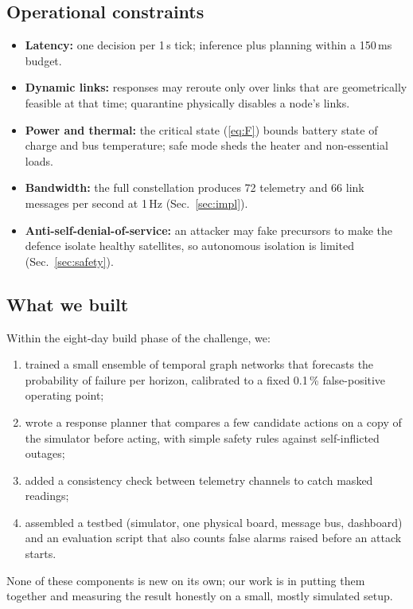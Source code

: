\documentclass[conference]{IEEEtran}
\begin{document}
\subsection{Operational constraints}
\begin{itemize}
\item \textbf{Latency:} one decision per 1\,s tick; inference plus planning within a 150\,ms budget.
\item \textbf{Dynamic links:} responses may reroute only over links that are geometrically feasible
at that time; quarantine physically disables a node's links.
\item \textbf{Power and thermal:} the critical state (\ref{eq:F}) bounds battery state of charge and
bus temperature; safe mode sheds the heater and non-essential loads.
\item \textbf{Bandwidth:} the full constellation produces 72 telemetry and 66 link messages per second
at 1\,Hz (Sec.~\ref{sec:impl}).
\item \textbf{Anti-self-denial-of-service:} an attacker may fake precursors to make the defence
isolate healthy satellites, so autonomous isolation is limited (Sec.~\ref{sec:safety}).
\end{itemize}

\subsection{What we built}
Within the eight-day build phase of the challenge, we:
\begin{enumerate}
\item trained a small ensemble of temporal graph networks that forecasts the probability of failure
per horizon, calibrated to a fixed 0.1\,\% false-positive operating point;
\item wrote a response planner that compares a few candidate actions on a copy of the simulator
before acting, with simple safety rules against self-inflicted outages;
\item added a consistency check between telemetry channels to catch masked readings;
\item assembled a testbed (simulator, one physical board, message bus, dashboard) and an evaluation
script that also counts false alarms raised before an attack starts.
\end{enumerate}
None of these components is new on its own; our work is in putting them together and measuring the
result honestly on a small, mostly simulated setup.
\end{document}
